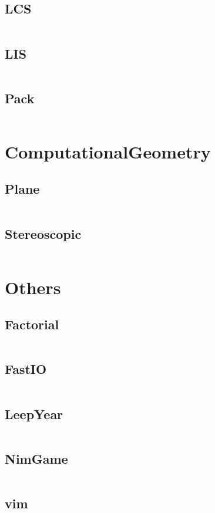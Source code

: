 \documentclass[a4paper,11pt]{article}
\begin{document}
\subsection{LCS}
\inputminted[breaklines]{c++}{Template/05++DynamicProgramming/+LCS.cpp}
\subsection{LIS}
\inputminted[breaklines]{c++}{Template/05++DynamicProgramming/+LIS.cpp}
\subsection{Pack}
\inputminted[breaklines]{c++}{Template/05++DynamicProgramming/+Pack.cpp}

\newpage
\section{ComputationalGeometry}
\subsection{Plane}
\inputminted[breaklines]{c++}{Template/06++ComputationalGeometry/+Plane.cpp}
\subsection{Stereoscopic}
\inputminted[breaklines]{c++}{Template/06++ComputationalGeometry/+Stereoscopic.cpp}

\newpage
\section{Others}
\subsection{Factorial}
\inputminted[breaklines]{c++}{Template/07++Others/+Factorial.cpp}
\subsection{FastIO}
\inputminted[breaklines]{c++}{Template/07++Others/+FastIO.cpp}
\subsection{LeepYear}
\inputminted[breaklines]{c++}{Template/07++Others/+LeepYear.cpp}
\subsection{NimGame}
\inputminted[breaklines]{c++}{Template/07++Others/+NimGame.cpp}
\subsection{vim}
\inputminted[breaklines]{c++}{Template/07++Others/+vim.vim}

\newpage
\end{document}
